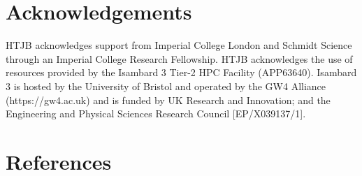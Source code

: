 \documentclass[
]{article}
\begin{document}
\section{Acknowledgements}\label{acknowledgements}

HTJB acknowledges support from Imperial College London and Schmidt
Science through an Imperial College Research Fellowship. HTJB
acknowledges the use of resources provided by the Isambard 3 Tier-2 HPC
Facility (APP63640). Isambard 3 is hosted by the University of Bristol
and operated by the GW4 Alliance (https://gw4.ac.uk) and is funded by UK
Research and Innovation; and the Engineering and Physical Sciences
Research Council {[}EP/X039137/1{]}.

\section*{References}\label{references}
\end{document}
